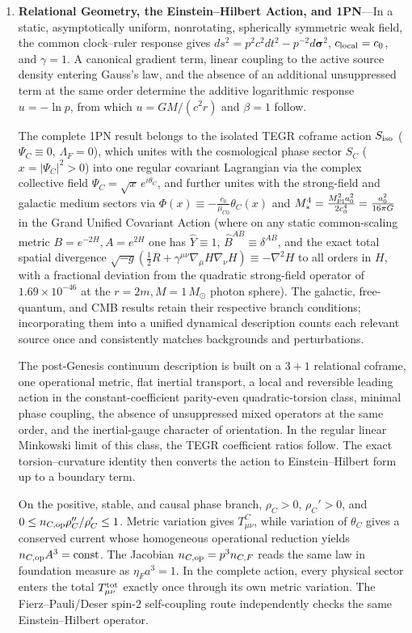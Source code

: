 \documentclass[11pt,a4paper]{article}
\begin{document}
\begin{enumerate}[label=\arabic*.]
\item \textbf{Relational Geometry, the Einstein--Hilbert Action, and 1PN}---In a static, asymptotically uniform, nonrotating, spherically symmetric weak field, the common clock--ruler response gives $ds^2=p^2c^2dt^2-p^{-2}d\boldsymbol{\sigma}^2$, $c_{\rm local}=c_0$, and $\gamma=1$. A canonical gradient term, linear coupling to the active source density entering Gauss's law, and the absence of an additional unsuppressed term at the same order determine the additive logarithmic response $u=-\ln p$, from which $u=GM/(c^2r)$ and $\beta=1$ follow.


The complete 1PN result belongs to the isolated TEGR coframe action $S_{\rm iso}$ ($\Psi_C \equiv 0$, $\Lambda_F = 0$), which unites with the cosmological phase sector $S_C$ ($x = |\Psi_C|^2 > 0$) into one regular covariant Lagrangian via the complex collective field $\Psi_C = \sqrt{x}\,e^{i\theta_C}$, and further unites with the strong-field and galactic medium sectors via $\Phi(x) \equiv -\frac{c_0}{\mu_{C0}}\theta_C(x)$ and $M_*^4 = \frac{M_{\rm Pl}^2 a_0^2}{2 c_0^4} = \frac{a_0^2}{16\pi G}$ in the Grand Unified Covariant Action (where on any static common-scaling metric $B=e^{-2H}, A=e^{2H}$ one has $\widehat{Y}\equiv 1$, $\widehat{B}^{AB}\equiv\delta^{AB}$, and the exact total spatial divergence $\sqrt{-g}(\frac{1}{2}R + \gamma^{\mu\nu}\nabla_\mu H\nabla_\nu H) \equiv -\nabla^2 H$ to all orders in $H$, with a fractional deviation from the quadratic strong-field operator of $1.69\times 10^{-46}$ at the $r=2m, M=1\,M_\odot$ photon sphere). The galactic, free-quantum, and CMB results retain their respective branch conditions; incorporating them into a unified dynamical description counts each relevant source once and consistently matches backgrounds and perturbations.

The post-Genesis continuum description is built on a $3+1$ relational coframe, one operational metric, flat inertial transport, a local and reversible leading action in the constant-coefficient parity-even quadratic-torsion class, minimal phase coupling, the absence of unsuppressed mixed operators at the same order, and the inertial-gauge character of orientation. In the regular linear Minkowski limit of this class, the TEGR coefficient ratios follow. The exact torsion--curvature identity then converts the action to Einstein--Hilbert form up to a boundary term.

On the positive, stable, and causal phase branch, $\rho_C>0$, $\rho_C'>0$, and $0\le n_{C,{\rm op}}\rho_C''/\rho_C'\le1$. Metric variation gives $T^C_{\mu\nu}$, while variation of $\theta_C$ gives a conserved current whose homogeneous operational reduction yields $n_{C,{\rm op}}A^3=\mathrm{const}$. The Jacobian $n_{C,{\rm op}}=p^3n_{C,F}$ reads the same law in foundation measure as $\eta_Fa^3=1$. In the complete action, every physical sector enters the total $T^{\rm tot}_{\mu\nu}$ exactly once through its own metric variation. The Fierz--Pauli/Deser spin-2 self-coupling route independently checks the same Einstein--Hilbert operator.


\end{enumerate}
\end{document}
